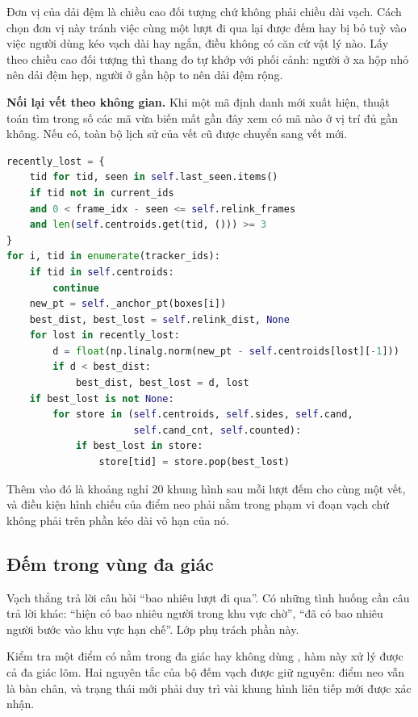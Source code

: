 Đơn vị của dải đệm là chiều cao đối tượng chứ không phải chiều dài vạch. Cách chọn
đơn vị này tránh việc cùng một lượt đi qua lại
được đếm hay bị bỏ tuỳ vào việc người dùng kéo vạch dài hay ngắn, điều không có
căn cứ vật lý nào. Lấy theo chiều cao đối tượng thì thang đo tự khớp với phối
cảnh: người ở xa hộp nhỏ nên dải đệm hẹp, người ở gần hộp to nên dải đệm rộng.

\textbf{Nối lại vết theo không gian.} Khi một mã định danh mới xuất hiện, thuật
toán tìm trong số các mã vừa biến mất gần đây xem có mã nào ở vị trí đủ gần
không. Nếu có, toàn bộ lịch sử của vết cũ được chuyển sang vết mới.

\begin{lstlisting}[language=Python, caption={Nối lại vết sau khi ByteTrack đổi mã định danh}]
recently_lost = {
    tid for tid, seen in self.last_seen.items()
    if tid not in current_ids
    and 0 < frame_idx - seen <= self.relink_frames
    and len(self.centroids.get(tid, ())) >= 3
}
for i, tid in enumerate(tracker_ids):
    if tid in self.centroids:
        continue
    new_pt = self._anchor_pt(boxes[i])
    best_dist, best_lost = self.relink_dist, None
    for lost in recently_lost:
        d = float(np.linalg.norm(new_pt - self.centroids[lost][-1]))
        if d < best_dist:
            best_dist, best_lost = d, lost
    if best_lost is not None:
        for store in (self.centroids, self.sides, self.cand,
                      self.cand_cnt, self.counted):
            if best_lost in store:
                store[tid] = store.pop(best_lost)
\end{lstlisting}

Thêm vào đó là khoảng nghỉ 20 khung hình sau mỗi lượt đếm cho cùng một vết, và
điều kiện hình chiếu của điểm neo phải nằm trong phạm vi đoạn vạch chứ không phải
trên phần kéo dài vô hạn của nó.


\subsection{Đếm trong vùng đa giác}

Vạch thẳng trả lời câu hỏi ``bao nhiêu lượt đi qua''. Có những tình huống cần câu trả
lời khác: ``hiện có bao nhiêu người trong khu vực chờ'', ``đã có bao nhiêu người bước
vào khu vực hạn chế''. Lớp  phụ trách phần này.

Kiểm tra một điểm có nằm trong đa giác hay không dùng , hàm
này xử lý được cả đa giác lõm. Hai nguyên tắc của bộ đếm vạch được giữ nguyên: điểm neo
vẫn là bàn chân, và trạng thái mới phải duy trì vài khung hình liên tiếp mới được xác
nhận.

